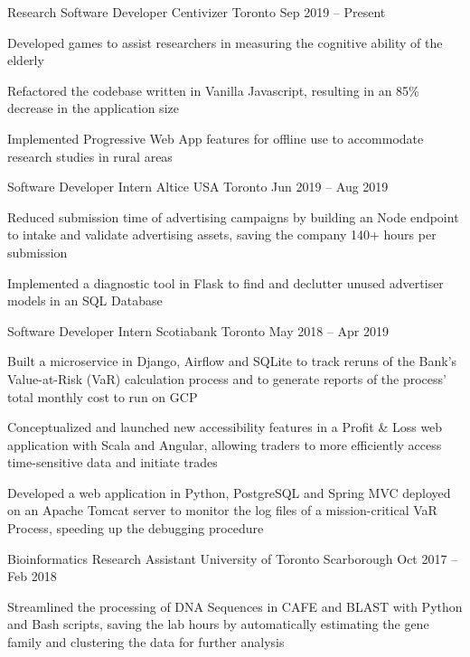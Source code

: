 \begin{cventries}
  \cventry
    {Research Software Developer}
    {Centivizer}
    {Toronto}
    {Sep 2019 -- Present}
    {}
    {
      \begin{cvitems}
        \item {Developed games to assist researchers in measuring the cognitive ability of the elderly}
        \item {Refactored the codebase written in Vanilla Javascript, resulting in an 85\% decrease in the application size}
        \item {Implemented Progressive Web App features for offline use to accommodate research studies in rural areas}
      \end{cvitems}
    }
  \cventry
    {Software Developer Intern}
    {Altice USA}
    {Toronto}
    {Jun 2019 -- Aug 2019}
    {}
    {
    \begin{cvitems}
      \item {Reduced submission time of advertising campaigns by building an Node endpoint to intake and validate advertising assets, saving the company 140+ hours per submission}
      \item {Implemented a diagnostic tool in Flask to find and declutter unused advertiser models in an SQL Database}
    \end{cvitems}
    }
  \cventry
    {Software Developer Intern}
    {Scotiabank}
    {Toronto}
    {May 2018 -- Apr 2019}
    {}
    {
      \begin{cvitems}
        \item {Built a microservice in Django, Airflow and SQLite to track reruns of the Bank's Value-at-Risk (VaR) calculation process and to generate reports of the process' total monthly cost to run on GCP}
        \item {Conceptualized and launched new accessibility features in a Profit \& Loss web application with Scala and Angular, allowing traders to more efficiently access time-sensitive data and initiate trades}
        \item {Developed a web application in Python, PostgreSQL and Spring MVC deployed on an Apache Tomcat server to monitor the log files of a mission-critical VaR Process, speeding up the debugging procedure}
      \end{cvitems}
    }
  
  \cventry
    {Bioinformatics Research Assistant}
    {University of Toronto}
    {Scarborough}
    {Oct 2017 -- Feb 2018}
    {}
    {
      \begin{cvitems}
        \item {Streamlined the processing of DNA Sequences in CAFE and BLAST with Python and Bash scripts, saving the lab hours by automatically estimating the gene family and clustering the data for further analysis}
      \end{cvitems}
    }
\end{cventries}
